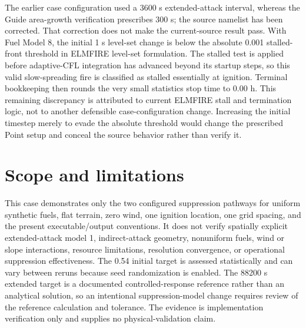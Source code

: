 The earlier case configuration used a 3600 s extended-attack interval, whereas the Guide area-growth verification prescribes 300 s; the source namelist has been corrected. That correction does not make the current-source result pass. With Fuel Model 8, the initial 1 s level-set change is below the absolute 0.001 stalled-front threshold in ELMFIRE level-set formulation. The stalled test is applied before adaptive-CFL integration has advanced beyond its startup steps, so this valid slow-spreading fire is classified as stalled essentially at ignition. Terminal bookkeeping then rounds the very small statistics stop time to 0.00 h. This remaining discrepancy is attributed to current ELMFIRE stall and termination logic, not to another defensible case-configuration change. Increasing the initial timestep merely to evade the absolute threshold would change the prescribed Point setup and conceal the source behavior rather than verify it.

\section{Scope and limitations}

This case demonstrates only the two configured suppression pathways for uniform synthetic fuels, flat terrain, zero wind, one ignition location, one grid spacing, and the present executable/output conventions. It does not verify spatially explicit extended-attack model 1, indirect-attack geometry, nonuniform fuels, wind or slope interactions, resource limitations, resolution convergence, or operational suppression effectiveness. The 0.54 initial target is assessed statistically and can vary between reruns because seed randomization is enabled. The 88200 s extended target is a documented controlled-response reference rather than an analytical solution, so an intentional suppression-model change requires review of the reference calculation and tolerance. The evidence is implementation verification only and supplies no physical-validation claim.
